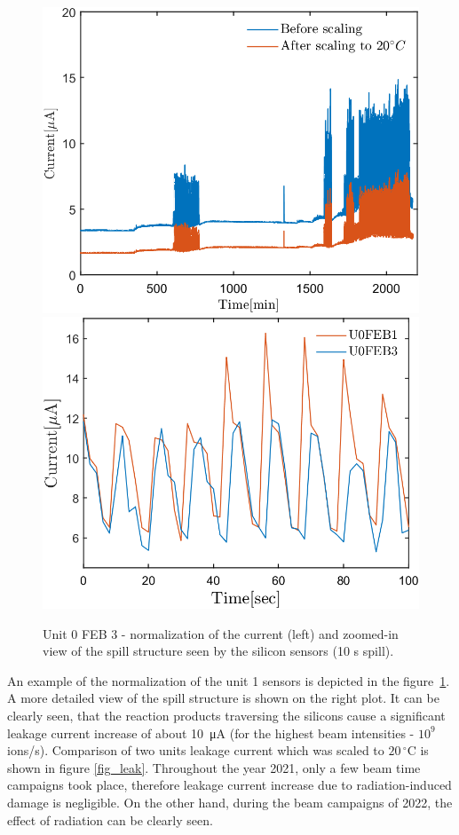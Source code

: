 \begin{figure}[!h]
\centering
\includegraphics[width=0.45\columnwidth]{Chapter6/DCS/images/uranium/current_U_highintensity.png}
\includegraphics[width=0.47\columnwidth]{Chapter6/DCS/images/uranium/U3L1_spill.png}
\caption{Unit 0 \gls{FEB} 3 - normalization of the current (left) and zoomed-in view of the spill structure seen by the silicon sensors (10 s spill).}
\label{fig_sensors_spill}
\end{figure}

An example of the normalization of the unit 1 sensors is depicted in the figure~\ref{fig_sensors_spill}. A more detailed view of the spill structure is shown on the right plot. It can be clearly seen, that the reaction products traversing the silicons cause a significant leakage current increase of about \SI{10}{\micro A} (for the highest beam intensities - $10^{9}$ ions/s). Comparison of two units leakage current which was scaled to $20\,^{\circ}$C is shown in figure \ref{fig_leak}. Throughout the year 2021, only a few beam time campaigns took place, therefore leakage current increase due to radiation-induced damage is negligible. On the other hand, during the beam campaigns of 2022, the effect of radiation can be clearly seen.

